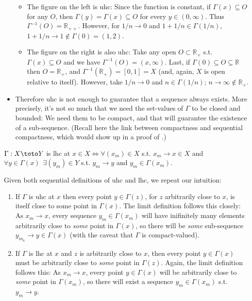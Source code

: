 \documentclass{article}
\begin{document}
\begin{itemize}[label=$\bullet$]
    \begin{itemize}[label=$\circ$]
      \item The figure on the left is uhc: Since the function is constant, if $\Gamma(x) \subseteq O$ for any $O$, then $\Gamma(y) = \Gamma(x) \subseteq O$ for every $y \in (0, \infty)$. Thus $\Gamma^{-1}(O) = \mathbb{R}_{++}$. However, for $1/n \to 0$ and $1 + 1/n \in \Gamma(1/n)$, $1 + 1/n \to 1 \notin \Gamma(0) = (1, 2)$.

      \item The figure on the right is also uhc: Take any open $O \subset \mathbb{R}_+$ s.t. $\Gamma(x) \subseteq O$ and we have $\Gamma^{-1}(O) = (x, \infty)$. Last, if $\Gamma(0) \subseteq O \subseteq \mathbb{R}$ then $O = \mathbb{R}_+$, and $\Gamma^{-1}(\mathbb{R}_+) = [0, 1] = X$  (and, again, $X$ is open relative to itself). However, take $1/n \to 0$ and $n \in \Gamma(1/n)$; $n \to \infty \notin \mathbb{R}_+$.
    \end{itemize}

  \item Therefore uhc is not enough to guarantee that a sequence always exists. More precisely, it's not so much that we need the set-values of $\Gamma$ to be closed and bounded: We need them to be compact, and that will guarantee the existence of a sub-sequence. (Recall here the link between compactness and sequential compactness, which would show up in a proof of .)
\end{itemize}

\begin{theorem}\label{thm:lecture3_compactness_lhc_sequential}
  $\Gamma: X \toto Y$ is lhc at $x \in X \iff \forall (x_m) \in X$ s.t. $x_m \to x \in X$ and $\forall y \in \Gamma(x) ~~ \exists (y_m) \in Y$ s.t. $y_m \to y$ and $y_m \in \Gamma(x_m)$.
\end{theorem}

Given both sequential definitions of uhc and lhc, we repeat our intuition:
\begin{enumerate}
  \item If $\Gamma$ is uhc at $x$ then every point $y \in \Gamma(z)$, for $z$ arbitrarily close to $x$, is itself close to some point in $\Gamma(x)$.  The limit definition follows this closely: As $x_m \to x$, every sequence $y_m \in \Gamma(x_m)$ will have inifinitely many elements arbitrarily close to \textit{some} point in $\Gamma(x)$, so there will be \textit{some} sub-sequence $y_{m_k} \to y \in \Gamma(x)$ (with the caveat that $\Gamma$ is compact-valued).

  \item If $\Gamma$ is lhc at $x$ and $z$ is arbitrarily close to $x$, then every point $y \in \Gamma(x)$ must be arbitrarily close to \textit{some} point in $\Gamma(z)$.  Again, the limit definition follows this: As $x_m \to x$, every point $y \in \Gamma(x)$ will be arbitrarily close to \textit{some} point in $\Gamma(x_m)$, so there will exist a sequence $y_m \in \Gamma(x_m)$ s.t. $y_m \to y$.
\end{enumerate}
\end{document}
